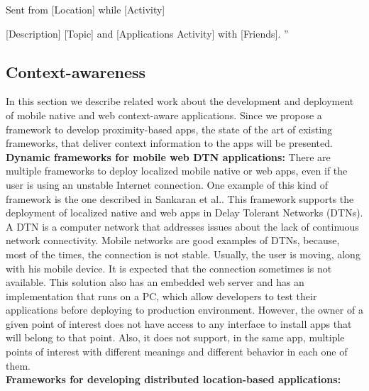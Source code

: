Sent from [Location] while [Activity]

[Description] [Topic] and [Applications Activity] with 
[Friends].
''
\\
\subsection{Context-awareness}
\label{sub:frameworks_context_aware}
In this section we describe related work about the
development and deployment of mobile native and web 
context-aware applications.
Since we propose a framework to develop
proximity-based apps, the state
of the art of existing frameworks, that deliver
context information to the apps will be presented.
\\
\textbf{Dynamic frameworks for 
mobile web DTN applications:}
There are multiple frameworks to deploy localized
mobile native or web apps, even if the user is using an
unstable Internet connection. One example of this
kind of framework is the one
described in Sankaran et al.\cite{Sankaran2014}.
This framework supports the deployment of localized 
native and
web apps in Delay Tolerant Networks (DTNs).
A DTN is a computer network that 
addresses issues about the lack of continuous network
connectivity. 
Mobile networks are good examples of DTNs,
because, most of the times, the connection is not stable.
Usually, the user is moving, along with his mobile 
device.
It is expected that the connection sometimes is not
available.  
This solution also has an embedded web server 
and has an implementation that runs on a PC, which allow
developers to test their applications before deploying
to production environment.
However, the owner of a given point of interest does not
have access to any interface to install apps that will
belong to that point. Also, it does not support, in the
same app, multiple points of interest with different
meanings and different behavior in each one of them.
\\
\textbf{Frameworks for developing distributed
location-based applications:}
